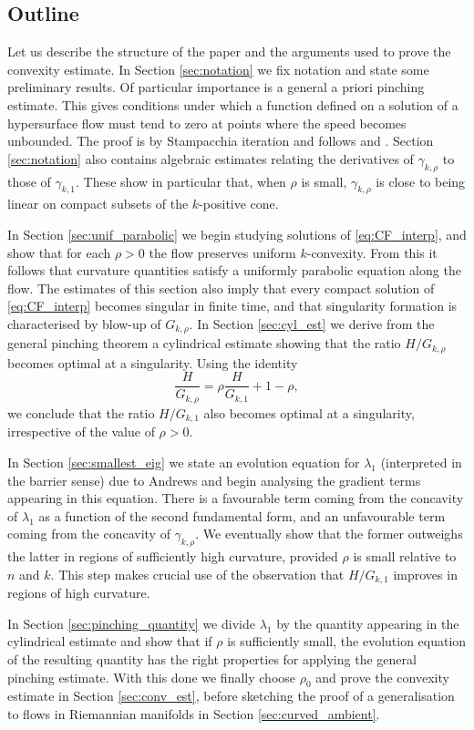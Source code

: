 \documentclass[12pt]{amsart}
\begin{document}
\subsection{Outline} Let us describe the structure of the paper and the arguments used to prove the convexity estimate. In Section \ref{sec:notation} we fix notation and state some preliminary results. Of particular importance is a general a priori pinching estimate. This gives conditions under which a function defined on a solution of a hypersurface flow must tend to zero at points where the speed becomes unbounded. The proof is by Stampacchia iteration and follows \cite{Huisk84} and \cite{Bren-Huisk17}. Section \ref{sec:notation} also contains algebraic estimates relating the derivatives of $\gamma_{k,\rho}$ to those of $\gamma_{k,1}$. These show in particular that, when $\rho$ is small, $\gamma_{k,\rho}$ is close to being linear on compact subsets of the $k$-positive cone. 

In Section \ref{sec:unif_parabolic} we begin studying solutions of \eqref{eq:CF_interp}, and show that for each $\rho >0$ the flow preserves uniform $k$-convexity. From this it follows that curvature quantities satisfy a uniformly parabolic equation along the flow. The estimates of this section also imply that every compact solution of \eqref{eq:CF_interp} becomes singular in finite time, and that singularity formation is characterised by blow-up of $G_{k,\rho}$. In Section \ref{sec:cyl_est} we derive from the general pinching theorem a cylindrical estimate showing that the ratio $H/G_{k,\rho}$ becomes optimal at a singularity. Using the identity 
\[\frac{H}{G_{k,\rho}} = \rho \frac{H}{G_{k,1}} + 1-\rho,\]
we conclude that the ratio $H/G_{k,1}$ also becomes optimal at a singularity, irrespective of the value of $\rho >0$. 

In Section \ref{sec:smallest_eig} we state an evolution equation for $\lambda_1$ (interpreted in the barrier sense) due to Andrews \cite{And07} and begin analysing the gradient terms appearing in this equation. There is a favourable term coming from the concavity of $\lambda_1$ as a function of the second fundamental form, and an unfavourable term coming from the concavity of $\gamma_{k,\rho}$. We eventually show that the former outweighs the latter in regions of sufficiently high curvature, provided $\rho$ is small relative to $n$ and $k$. This step makes crucial use of the observation that $H/G_{k,1}$ improves in regions of high curvature. 

In Section \ref{sec:pinching_quantity} we divide $\lambda_1$ by the quantity appearing in the cylindrical estimate and show that if $\rho$ is sufficiently small,
the evolution equation of the resulting quantity has the right properties for applying the general pinching estimate. With this done we finally choose $\rho_0$ and prove the convexity estimate in Section \ref{sec:conv_est}, before sketching the proof of a generalisation to flows in Riemannian manifolds in Section \ref{sec:curved_ambient}.
\end{document}
